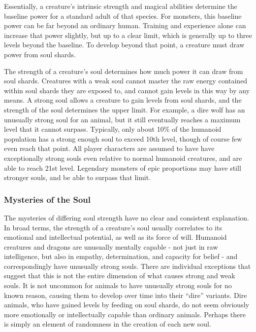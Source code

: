             Essentially, a creature's intrinsic strength and magical abilities determine the baseline power for a standard adult of that species.
            For monsters, this baseline power can be far beyond an ordinary human.
            Training and experience alone can increase that power slightly, but up to a clear limit, which is generally up to three levels beyond the baseline.
            To develop beyond that point, a creature must draw power from soul shards.

            The strength of a creature's soul determines how much power it can draw from soul shards.
            Creatures with a weak soul cannot master the raw energy contained within soul shards they are exposed to, and cannot gain levels in this way by any means.
            A strong soul allows a creature to gain levels from soul shards, and the strength of the soul determines the upper limit.
            For example, a dire wolf has an unusually strong soul for an animal, but it still eventually reaches a maximum level that it cannot surpass.
            Typically, only about 10\% of the humanoid population has a strong enough soul to exceed 10th level, though of course few even reach that point.
            All player characters are assumed to have have exceptionally strong souls even relative to normal humanoid creatures, and are able to reach 21st level.
            Legendary monsters of epic proportions may have still stronger souls, and be able to surpass that limit.

        \subsubsection{Mysteries of the Soul}
            The mysteries of differing soul strength have no clear and consistent explanation.
            In broad terms, the strength of a creature's soul usually correlates to its emotional and intellectual potential, as well as its force of will.
            Humanoid creatures and dragons are unusually mentally capable - not just in raw intelligence, but also in empathy, determination, and capacity for belief - and correspondingly have unusually strong souls.
            There are individual exceptions that suggest that this is not the entire dimension of what causes strong and weak souls.
            It is not uncommon for animals to have unusually strong souls for no known reason, causing them to develop over time into their ``dire'' variants.
            Dire animals, who have gained levels by feeding on soul shards, do not seem obviously more emotionally or intellectually capable than ordinary animals.
            Perhaps there is simply an element of randomness in the creation of each new soul.

